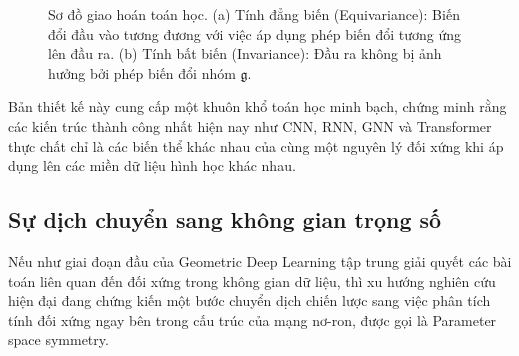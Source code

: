 \begin{figure}[H]
    \centering
    \caption{Sơ đồ giao hoán toán học. (a) Tính đẳng biến (Equivariance): Biến đổi đầu vào tương đương với việc áp dụng phép biến đổi tương ứng lên đầu ra. (b) Tính bất biến (Invariance): Đầu ra không bị ảnh hưởng bởi phép biến đổi nhóm $\mathfrak{g}$.}
    \label{fig:commutative-diagram}
\end{figure}

Bản thiết kế này cung cấp một khuôn khổ toán học minh bạch, chứng minh rằng các kiến trúc thành công nhất hiện nay như CNN, RNN, GNN và Transformer thực chất chỉ là các biến thể khác nhau của cùng một nguyên lý đối xứng khi áp dụng lên các miền dữ liệu hình học khác nhau.

\subsection{Sự dịch chuyển sang không gian trọng số}
\label{subsec:su-dich-chuyen-khong-gian-trong-so}

Nếu như giai đoạn đầu của Geometric Deep Learning tập trung giải quyết các bài toán liên quan đến đối xứng trong không gian dữ liệu, thì xu hướng nghiên cứu hiện đại đang chứng kiến một bước chuyển dịch chiến lược sang việc phân tích tính đối xứng ngay bên trong cấu trúc của mạng nơ-ron, được gọi là Parameter space symmetry.

